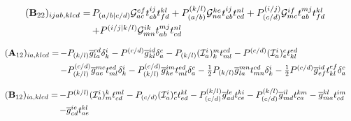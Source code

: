 \begin{subappendices}
\begin{equation}
    \begin{array}{r@{\,}l}
        (\mathbf{B}_{22})_{ijab,klcd}
        =
        &
        P_{(a/b|c/d)}
        \mathcal{G}_{ac}^{ef}
        t_{eb}^{ij}
        t_{fd}^{kl}
        +
        P_{(a/b)}^{(k/l)}
        \mathcal{G}_{na}^{ke}
        t_{eb}^{ij}
        t_{cd}^{nl}
        +
        P_{(c/d)}^{(i/j)}
        \mathcal{G}_{mc}^{if}
        t_{ab}^{mj}
        t_{fd}^{kl}
        \\[5pt]
        &
        +
        P^{(i/j|k/l)}
        \mathcal{G}_{mn}^{ik}
        t_{ab}^{mj}
        t_{cd}^{nl}
    \end{array}
\end{equation}

\begin{equation}
    \begin{array}{r@{\,}l}
        (\mathbf{A}_{12})_{ia,klcd}
        =
        &
        -
        P_{(k/l)}
        \overline{g}_{la}^{cd}
        \delta_k^i
        -
        P^{(c/d)}
        \overline{g}_{kl}^{id}
        \delta_a^c
        -
        P_{(k/l)}
        (\mathcal{I}_a^i)_k^m
        t_{ml}^{cd}
        -
        P^{(c/d)}
        (\mathcal{I}_a^i)_e^c
        t_{kl}^{ed}
        \\[5pt]
        &
        -
        P_{(k/l)}^{(c/d)}
        \overline{g}_{ae}^{mc}
        t_{ml}^{ed}
        \delta_k^i
        -
        P_{(k/l)}^{(c/d)}
        \overline{g}_{ke}^{im}
        t_{ml}^{ed}
        \delta_a^c
        -
        \tfrac{1}{2}
        P_{(k/l)}
        \overline{g}_{la}^{mn}
        t_{mn}^{cd}
        \delta_k^i
        -
        \tfrac{1}{2}
        P^{(c/d)}
        \overline{g}_{ef}^{id}
        t_{kl}^{ef}
        \delta_a^c
    \end{array}
\end{equation}

\begin{equation}
    \begin{array}{r@{\,}l}
        (\mathbf{B}_{12})_{ia,klcd}
        =
        &
        -
        P^{(k/l)}
        (\mathcal{I}_a^i)_m^k
        t_{cd}^{ml}
        -
        P_{(c/d)}
        (\mathcal{I}_a^i)_c^e
        t_{ed}^{kl}
        -
        P_{(c/d)}^{(k/l)}
        \overline{g}_{ad}^{le}
        t_{ce}^{ki}
        -
        P_{(c/d)}^{(k/l)}
        \overline{g}_{md}^{il}
        t_{ca}^{km}
        -
        \overline{g}_{ma}^{kl}
        t_{cd}^{im}
        \\[5pt]
        &
        -
        \overline{g}_{cd}^{ie}
        t_{ae}^{kl}
    \end{array}
\end{equation}


\end{subappendices}
